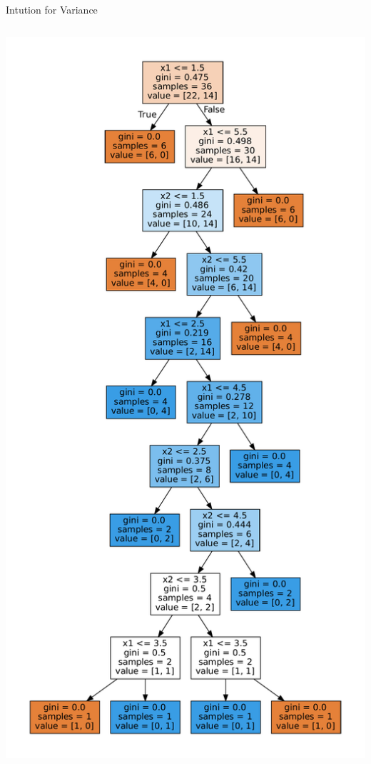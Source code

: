 \documentclass{beamer}
\begin{document}
\begin{frame}{Intution for Variance}
\begin{columns}
\begin{column}{0.5\textwidth}
\begin{center}
\includegraphics[scale=0.2]{../figures/decision-trees/bias-variance-full-depth-sklearn.pdf}

\end{center}
\end{column}
\end{columns}
\end{frame}
\end{document}
